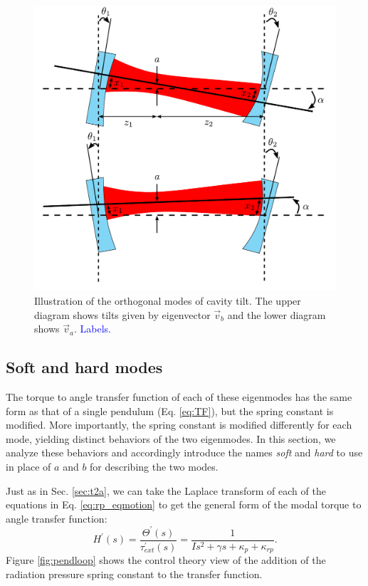 \begin{figure}
\begin{centering}
\includegraphics[width=0.6\columnwidth]{figures/eigenmodes.pdf}
\caption{Illustration of the orthogonal modes of cavity tilt. The
  upper diagram shows tilts given by eigenvector $\vec{v}_b$ and the
  lower diagram shows $\vec{v}_a$. \textcolor{blue}{Labels.}}
\label{fig:ss}
\end{centering}
\end{figure}




\subsection{Soft and hard modes} 
The torque to angle transfer function of each of these eigenmodes has
the same form as that of a single pendulum (Eq. \ref{eq:TF}), but the
spring constant is modified. More importantly, the spring constant is
modified differently for each mode, yielding distinct behaviors of the
two eigenmodes. In this section, we analyze these behaviors and
accordingly introduce the names \emph{soft} and \emph{hard} to use in
place of $a$ and $b$ for describing the two modes.

Just as in Sec. \ref{sec:t2a}, we can take the Laplace transform of
each of the equations in Eq. \ref{eq:rp_eqmotion} to get the general
form of the modal torque to angle transfer function:
\begin{equation}
H^\prime(s) = \frac{\Theta^\prime(s)}{\tau_{ext}^\prime(s)} = \frac{1}{I s^2 + \gamma s +
  \kappa_p + \kappa_{rp}}.
\label{eq:modalTF}
\end{equation} 
Figure \ref{fig:pendloop} shows the control theory view of
the addition of the radiation pressure spring constant to the transfer
function.

